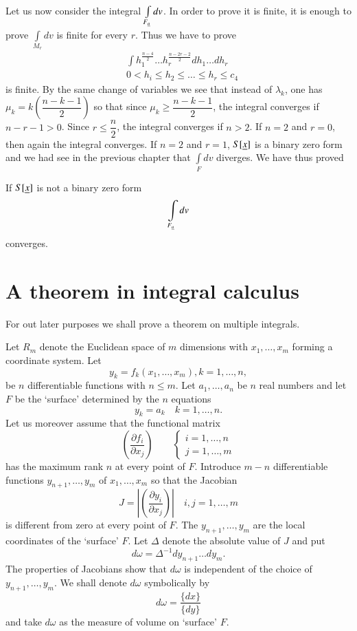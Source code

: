 Let us now consider the integral $\int\limits_{F_{\underline{a}}}dv$. In
order to prove it is finite, it is enough to prove
$\int\limits_{M_{r}}dv$ is finite for every $r$. Thus we have to prove
\begin{align*}
&\int h_{1}^{\frac{n-4}{2}}\ldots h_{r}^{\frac{n-2r-2}{2}}dh_{1}\ldots
  dh_{r}\\
& 0<h_{i}\leq h_{2}\leq \ldots \leq h_{r}\leq c_{4}
\end{align*}
is finite. By the same change of variables we see that instead of
$\lambda_{k}$, one has $\mu_{k}=k\left(\dfrac{n-k-1}{2}\right)$ so
that since $\mu_{k}\geq \dfrac{n-k-1}{2}$, the integral converges if
$n-r-1>0$. Since $r\leq \dfrac{n}{2}$, the integral converges if
$n>2$. If $n=2$ and $r=0$, then again the integral converges. If $n=2$
and $r=1$, $S[\underline{x}]$ is a binary zero form and we had see in the
previous chapter that $\int\limits_{F}dv$ diverges. We have thus
    proved

\begin{thm}\label{chap4:thm5}
If $S[\underline{x}]$ is not a binary zero form
$$
\int\limits_{F_{\underline{a}}}dv 
$$
converges.
\end{thm}

\section{A theorem in integral calculus}\label{chap4:sec5}\pageoriginale

For out later purposes we shall prove a theorem on multiple integrals.

Let $R_{m}$ denote the Euclidean space of $m$ dimensions with
$x_{1},\ldots,x_{m}$ forming a coordinate system. Let
$$
y_{k}=f_{k}(x_{1},\ldots,x_{m}),k=1,\ldots,n,
$$
be $n$ differentiable functions with $n\leq m$. Let
$a_{1},\ldots,a_{n}$ be $n$ real numbers and let $F$ be the `surface'
determined by the $n$ equations
$$
y_{k}=a_{k}\quad k=1,\ldots,n.
$$
Let us moreover assume that the functional matrix
$$
\left(\frac{\partial f_{i}}{\partial x_{j}}\right)\qquad 
\begin{cases}
i=1,\ldots, n\\
j=1,\ldots,m
\end{cases}
$$
has the maximum rank $n$ at every point of $F$. Introduce $m-n$
differentiable functions $y_{n+1},\ldots,y_{m}$ of
$x_{1},\ldots,x_{m}$ so that the Jacobian
$$
J=\left|\left(\frac{\partial y_{i}}{\partial x_{j}}\right)\right|\quad
i,j=1,\ldots,m
$$
is different from zero at every point of $F$. The
$y_{n+1},\ldots,y_{m}$ are the local coordinates of the `surface'
$F$. Let $\Delta$ denote the absolute value of $J$ and put
\begin{equation*}
d\omega=\Delta^{-1}dy_{n+1}\ldots dy_{m}.\tag{86}\label{c4:eq86}
\end{equation*}
The properties of Jacobians show that $d\omega$ is independent of the
choice of $y_{n+1},\ldots,y_{m}$. We shall denote $d\omega$
symbolically by 
\begin{equation*}
d\omega=\frac{\{dx\}}{\{dy\}}\tag{87}\label{c4:eq87}
\end{equation*}\pageoriginale
and take $d\omega$ as the measure of volume on `surface' $F$.

